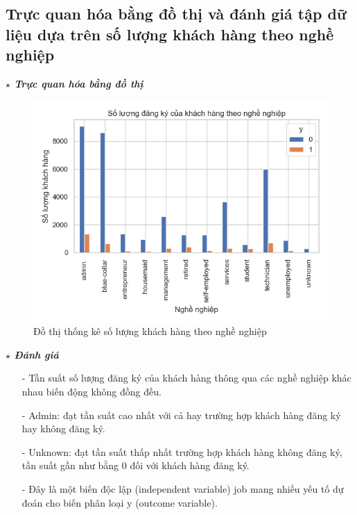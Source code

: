 \documentclass{report}
\begin{document}
        \pagebreak

        \subsection{Trực quan hóa bằng đồ thị và đánh giá tập dữ liệu dựa trên số lượng khách hàng theo nghề nghiệp}
            \fontsize{13}{10}\selectfont \textbf{$\star$\textit{ Trực quan hóa bằng đồ thị}}
                \begin{figure}[htp]
                    \centering
                    \includegraphics[scale = 0.8]{image/frequency_job.png}
                    \caption{Đồ thị thống kê số lượng khách hàng theo nghề nghiệp}
                \end{figure}
            
            \fontsize{13}{10}\selectfont \textbf{$\star$\textit{ Đánh giá}}
                \begin{enumerate}
                    \item [- ] Tần suất số lượng đăng ký của khách hàng thông qua các nghề nghiệp khác nhau biến động không đồng đều.
                    \item [- ] Admin: đạt tần suất cao nhất với cả hay trường hợp khách hàng đăng ký hay không đăng ký.
                    \item [- ] Unknown: đạt tần suất thấp nhất trường hợp khách hàng không đăng ký, tần suất gần như bằng 0 đối với khách hàng đăng ký.
                    \item [- ] Đây là một biến độc lập (independent variable) job mang nhiều yếu tố dự đoán cho biến phân loại y (outcome variable).
                \end{enumerate}
                 
\end{document}
